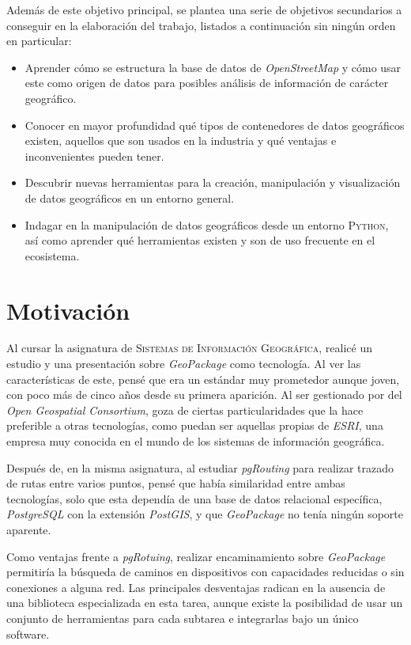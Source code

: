 	Además de este objetivo principal, se plantea una serie de objetivos secundarios a conseguir en la elaboración del trabajo, listados a continuación sin ningún orden en particular:
	\begin{itemize}
		\setlength\itemsep{0em}
		\item Aprender cómo se estructura la base de datos de \textit{OpenStreetMap} y cómo usar este como origen de datos para posibles análisis de información de carácter geográfico.
		\item Conocer en mayor profundidad qué tipos de contenedores de datos geográficos existen, aquellos que son usados en la industria y qué ventajas e inconvenientes pueden tener.
		\item Descubrir nuevas herramientas para la creación, manipulación y visualización de datos geográficos en un entorno general.
		\item Indagar en la manipulación de datos geográficos desde un entorno \textsc{Python}, así como aprender qué herramientas existen y son de uso frecuente en el ecosistema.
	\end{itemize}
	
\section{Motivación}
	Al cursar la asignatura de \textsc{Sistemas de Información Geográfica}, realicé un estudio y una presentación sobre \textit{GeoPackage} como tecnología. Al ver las características de este, pensé que era un estándar muy prometedor aunque joven, con poco más de cinco años desde su primera aparición. Al ser gestionado por del \textit{Open Geospatial Consortium}, goza de ciertas particularidades que la hace preferible a otras tecnologías, como puedan ser aquellas propias de \textit{ESRI}, una empresa muy conocida en el mundo de los sistemas de información geográfica.
	
	Después de, en la misma asignatura, al estudiar \textit{pgRouting} para realizar trazado de rutas entre varios puntos, pensé que había similaridad entre ambas tecnologías, solo que esta dependía de una base de datos relacional específica, \textit{PostgreSQL} con la extensión \textit{PostGIS}, y que \textit{GeoPackage} no tenía ningún soporte aparente.
	
	Como ventajas frente a \textit{pgRotuing}, realizar encaminamiento sobre \textit{GeoPackage} permitiría la búsqueda de caminos en dispositivos con capacidades reducidas o sin conexiones a alguna red. Las principales desventajas radican en la ausencia de una biblioteca especializada en esta tarea, aunque existe la posibilidad de usar un conjunto de herramientas para cada subtarea e integrarlas bajo un único software.
	
